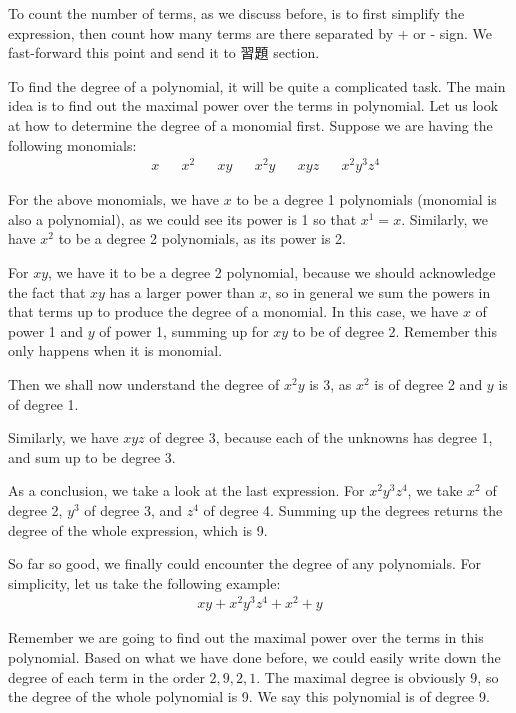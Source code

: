 \documentclass[12pt]{article}
\begin{document}
    To count the number of terms, as we discuss before, is to first simplify the expression, then count how many terms are there separated by + or - sign. We fast-forward this point and send it to 習題 section.

    To find the degree of a polynomial, it will be quite a complicated task. The main idea is to find out the maximal power over the terms in polynomial. Let us look at how to determine the degree of a monomial first. Suppose we are having the following monomials:\begin{align*}
        &x&&x^2&&xy&&x^2y&&xyz&&x^2y^3z^4
    \end{align*}

    For the above monomials, we have $x$ to be a degree 1 polynomials (monomial is also a polynomial), as we could see its power is 1 so that $x^1=x$. Similarly, we have $x^2$ to be a degree 2 polynomials, as its power is 2.

    For $xy$, we have it to be a degree 2 polynomial, because we should acknowledge the fact that $xy$ has a larger power than $x$, so in general we sum the powers in that terms up to produce the degree of a monomial. In this case, we have $x$ of power 1 and $y$ of power 1, summing up for $xy$ to be of degree 2. Remember this only happens when it is monomial.

    Then we shall now understand the degree of $x^2y$ is 3, as $x^2$ is of degree 2 and $y$ is of degree 1.

    Similarly, we have $xyz$ of degree 3, because each of the unknowns has degree 1, and sum up to be degree 3.

    As a conclusion, we take a look at the last expression. For $x^2y^3z^4$, we take $x^2$ of degree 2, $y^3$ of degree 3, and $z^4$ of degree 4. Summing up the degrees returns the degree of the whole expression, which is 9.

    So far so good, we finally could encounter the degree of any polynomials. For simplicity, let us take the following example:\begin{align*}
        xy+x^2y^3z^4+x^2+y
    \end{align*}

    Remember we are going to find out the maximal power over the terms in this polynomial. Based on what we have done before, we could easily write down the degree of each term in the order $2,9,2,1$. The maximal degree is obviously 9, so the degree of the whole polynomial is 9. We say this polynomial is of degree 9.
\end{document}
